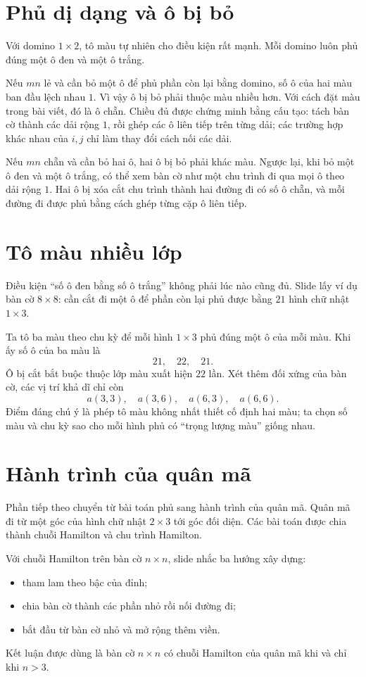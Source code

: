 \documentclass[11pt]{article}
\begin{document}
\section{Phủ dị dạng và ô bị bỏ}

Với domino \(1\times2\), tô màu tự nhiên cho điều kiện rất mạnh. Mỗi domino
luôn phủ đúng một ô đen và một ô trắng.

Nếu \(mn\) lẻ và cần bỏ một ô để phủ phần còn lại bằng domino, số ô của hai
màu ban đầu lệch nhau \(1\). Vì vậy ô bị bỏ phải thuộc màu nhiều hơn. Với
cách đặt màu trong bài viết, đó là ô chẵn. Chiều đủ được chứng minh bằng cấu
tạo: tách bàn cờ thành các dải rộng \(1\), rồi ghép các ô liên tiếp trên từng
dải; các trường hợp khác nhau của \(i,j\) chỉ làm thay đổi cách nối các dải.

Nếu \(mn\) chẵn và cần bỏ hai ô, hai ô bị bỏ phải khác màu. Ngược lại, khi bỏ
một ô đen và một ô trắng, có thể xem bàn cờ như một chu trình đi qua mọi ô
theo dải rộng \(1\). Hai ô bị xóa cắt chu trình thành hai đường đi có số ô
chẵn, và mỗi đường đi được phủ bằng cách ghép từng cặp ô liên tiếp.

\section{Tô màu nhiều lớp}

Điều kiện ``số ô đen bằng số ô trắng'' không phải lúc nào cũng đủ. Slide lấy
ví dụ bàn cờ \(8\times8\): cần cắt đi một ô để phần còn lại phủ được bằng
\(21\) hình chữ nhật \(1\times3\).

Ta tô ba màu theo chu kỳ để mỗi hình \(1\times3\) phủ đúng một ô của mỗi màu.
Khi ấy số ô của ba màu là
\[
  21,\quad 22,\quad 21.
\]
Ô bị cắt bắt buộc thuộc lớp màu xuất hiện \(22\) lần. Xét thêm đối xứng của
bàn cờ, các vị trí khả dĩ chỉ còn
\[
  a(3,3),\quad a(3,6),\quad a(6,3),\quad a(6,6).
\]
Điểm đáng chú ý là phép tô màu không nhất thiết cố định hai màu; ta chọn số
màu và chu kỳ sao cho mỗi hình phủ có ``trọng lượng màu'' giống nhau.

\section{Hành trình của quân mã}

Phần tiếp theo chuyển từ bài toán phủ sang hành trình của quân mã. Quân mã đi
từ một góc của hình chữ nhật \(2\times3\) tới góc đối diện. Các bài toán được
chia thành chuỗi Hamilton và chu trình Hamilton.

Với chuỗi Hamilton trên bàn cờ \(n\times n\), slide nhắc ba hướng xây dựng:
\begin{itemize}
  \item tham lam theo bậc của đỉnh;
  \item chia bàn cờ thành các phần nhỏ rồi nối đường đi;
  \item bắt đầu từ bàn cờ nhỏ và mở rộng thêm viền.
\end{itemize}
Kết luận được dùng là bàn cờ \(n\times n\) có chuỗi Hamilton của quân mã khi
và chỉ khi \(n>3\).
\end{document}

